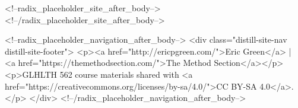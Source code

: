 \documentclass[
]{report}
\begin{document}
<!--radix_placeholder_site_after_body-->
<!--/radix_placeholder_site_after_body-->

<!--radix_placeholder_navigation_after_body-->
<div class="distill-site-nav distill-site-footer">
<p><a href="http://ericpgreen.com/">Eric Green</a> | <a
href="https://themethodsection.com/">The Method Section</a></p>
<p>GLHLTH 562 course materials shared with <a
href="https://creativecommons.org/licenses/by-sa/4.0/">CC BY-SA
4.0</a>.</p>
</div>
<!--/radix_placeholder_navigation_after_body-->
\end{document}
